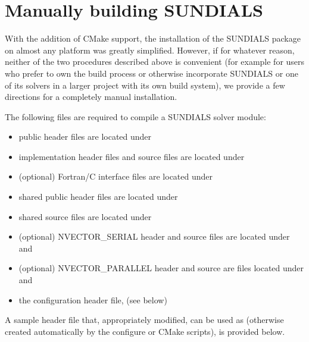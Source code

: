 \documentclass[letterpaper,10pt,english]{sphinxmanual}
\begin{document}
\section{Manually building SUNDIALS}
\label{Install:installation-manual}\label{Install:manually-building-sundials}
With the addition of CMake support, the installation of the SUNDIALS
package on almost any platform was greatly simplified.  However, if for
whatever reason, neither of the two procedures described above is
convenient (for example for users who prefer to own the build process
or otherwise incorporate SUNDIALS or one of its solvers in a larger
project with its own build system), we provide a few directions
for a completely manual installation.

The following files are required to compile a SUNDIALS solver module:
\begin{itemize}
\item {} 
public header files are located under 

\item {} 
implementation header files and source files are located under

\item {} 
(optional) Fortran/C interface files are located under

\item {} 
shared public header files are located under

\item {} 
shared source files are located under 

\item {} 
(optional) NVECTOR\_SERIAL header and source files are located under
 and 

\item {} 
(optional) NVECTOR\_PARALLEL header and source are files located
under  and 

\item {} 
the configuration header file,  (see below)

\end{itemize}

A sample header file that, appropriately modified, can be used as
 (otherwise created automatically by the
configure or CMake scripts), is provided below.
\end{document}

